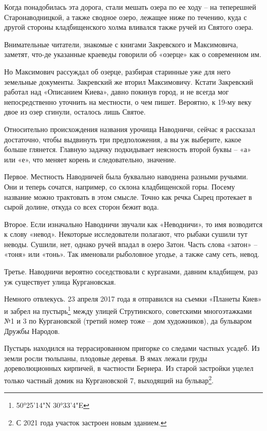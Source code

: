 Когда понадобилась эта дорога, стали мешать озера по ее ходу – на теперешней Старонаводницкой, а также сводное озеро, лежащее ниже по течению, куда с другой стороны кладбищенского холма вливался также ручей из Святого озера.

Внимательные читатели, знакомые с книгами Закревского и Максимовича, заметят, что-де указанные краеведы говорили об «озерце» как о современном им. 

Но Максимович рассуждал об озерце, разбирая старинные уже для него земельные документы. Закревский же вторил Максимовичу. Кстати Закревский работал над «Описанием Киева», давно покинув город, и не всегда мог непосредственно уточнить на местности, о чем пишет. Вероятно, к 19-му веку двое из озер сгинули, осталось лишь Святое.

Относительно происхождения названия урочища Наводничи, сейчас я рассказал достаточно, чтобы выдвинуть три предположения, а вы уж выберите, какое больше глянется. Главную задачку подкидывает неясность второй буквы – «а» или «е», что меняет корень и следовательно, значение.

Первое. Местность Наводничей была буквально наводнена разными ручьями. Они и теперь сочатся, например, со склона кладбищенской горы. Посему название можно трактовать в этом смысле. Точно как речка Сырец протекает в сырой долине, откуда со всех сторон бежит вода.

Второе. Если изначально Наводничи звучали как «Не\-водничи», то имя возводится к слову «невод». Некоторые исследователи полагают, что рыбаки сушили тут неводы. Сушили, нет, однако ручей впадал в озеро Затон. Часть слова «затон» – «тоня» или «тонь». Так именовали рыболовное угодье, а также саму сеть, невод.

Третье. Наводничи вероятно соседствовали с курганами, давним кладбищем, раз уж существует улица Кургановская.

Немного отвлекусь. 23 апреля 2017 года я отправился на съемки «Планеты Киев» и забрел на пустырь\footnote{50°25'14"N 30°33'4"E} между улицей Струтинского, советскими многоэтажками №1 и 3 по Кургановской (третий номер тоже – дом художников), да бульваром Дружбы Народов.

Пустырь находился на террасированном пригорке со следами частных усадеб. Из земли росли тюльпаны, плодовые деревья. В ямах лежали груды дореволюционных кирпичей, в частности Бернера. Из старой застройки уцелел только частный домик на Кургановской 7, выходящий на бульвар\footnote{С 2021 года участок застроен новым зданием.}.

